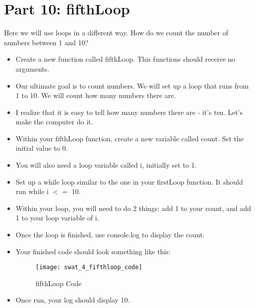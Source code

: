 \documentclass{article}
\begin{document}
\section*{Part 10: fifthLoop}
Here we will use loops in a different way.  How do we count the number of numbers between 1 and 10?
\begin{itemize}
	\item Create a new function called fifthLoop.  This functions should receive no arguments.
	\item Our ultimate goal is to count numbers.  We will set up a loop that runs from 1 to 10.  We will count how many numbers there are.
	\item I realize that it is easy to tell how many numbers there are - it's ten.  Let's make the computer do it.
	\item Within your fifthLoop function, create a new variable called count.  Set the initial value to 0.
	\item You will also need a loop variable called i, initially set to 1.
	\item Set up a while loop similar to the one in your firstLoop function.  It should run while i $<=$ 10.
	\item Within your loop, you will need to do 2 things:  add 1 to your count, and add 1 to your loop variable of i.
	\item Once the loop is finished, use console.log to display the count.
	\item Your finished code should look something like this:
	\begin{figure}[H]
  		\centering
  		\texttt{[image: swat\_4\_fifthloop\_code]}
  		\caption{fifthLoop Code}
	\end{figure}
	\item Once run, your log should display 10.
\end{itemize}
\end{document}
